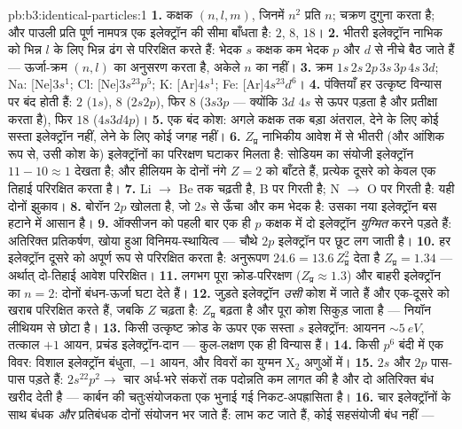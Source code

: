 \begin{solution}{pb:b3:identical-particles:1}
\textbf{1.} कक्षक $(n, l, m)$, जिनमें $n^2$ प्रति $n$; चक्रण दुगुना
करता है; और पाउली प्रति पूर्ण नामपत्र एक इलेक्ट्रॉन की सीमा बाँधता
है: $2$, $8$, $18$।
\textbf{2.} भीतरी इलेक्ट्रॉन नाभिक को भिन्न $l$ के लिए भिन्न ढंग से
परिरक्षित करते हैं: भेदक $s$ कक्षक कम भेदक $p$ और $d$ से नीचे बैठ
जाते हैं --- ऊर्जा-क्रम $(n, l)$ का अनुसरण करता है, अकेले $n$ का
नहीं।
\textbf{3.} क्रम $1s\,2s\,2p\,3s\,3p\,4s\,3d$; Na: [Ne]$3s^1$;
Cl: [Ne]$3s^23p^5$; K: [Ar]$4s^1$; Fe: [Ar]$4s^23d^6$।
\textbf{4.} पंक्तियाँ हर उत्कृष्ट विन्यास पर बंद होती हैं: $2$
($1s$), $8$ ($2s2p$), फिर $8$ ($3s3p$ --- क्योंकि $3d$ $4s$ से ऊपर
पड़ता है और प्रतीक्षा करता है), फिर $18$ ($4s3d4p$)।
\textbf{5.} एक बंद कोश: अगले कक्षक तक बड़ा अंतराल, देने के लिए कोई
सस्ता इलेक्ट्रॉन नहीं, लेने के लिए कोई जगह नहीं।
\textbf{6.} $Z_{\text{प्र}}$ नाभिकीय आवेश में से भीतरी (और आंशिक रूप
से, उसी कोश के) इलेक्ट्रॉनों का परिरक्षण घटाकर मिलता है: सोडियम का
संयोजी इलेक्ट्रॉन $11 - 10 \approx 1$ देखता है; और हीलियम के दोनों
नंगे $Z = 2$ को बाँटते हैं, प्रत्येक दूसरे को केवल एक तिहाई परिरक्षित
करता है।
\textbf{7.} Li $\to$ Be तक चढ़ती है, B पर गिरती है; N $\to$ O पर
गिरती है: यही दोनों झुकाव।
\textbf{8.} बोरॉन $2p$ खोलता है, जो $2s$ से ऊँचा और कम भेदक है: उसका
नया इलेक्ट्रॉन बस हटाने में आसान है।
\textbf{9.} ऑक्सीजन को पहली बार एक ही $p$ कक्षक में दो इलेक्ट्रॉन
\emph{युग्मित} करने पड़ते हैं: अतिरिक्त प्रतिकर्षण, खोया हुआ
विनिमय-स्थायित्व --- चौथे $2p$ इलेक्ट्रॉन पर छूट लग जाती है।
\textbf{10.} हर इलेक्ट्रॉन दूसरे को अपूर्ण रूप से परिरक्षित करता है:
अनुरूपण $24.6 = 13.6\,Z_{\text{प्र}}^2$ देता है $Z_{\text{प्र}} =
1.34$ --- अर्थात् दो-तिहाई आवेश परिरक्षित।
\textbf{11.} लगभग पूरा क्रोड-परिरक्षण ($Z_{\text{प्र}}
\approx 1.3$) और बाहरी इलेक्ट्रॉन का $n = 2$: दोनों बंधन-ऊर्जा घटा
देते हैं।
\textbf{12.} जुड़ते इलेक्ट्रॉन \emph{उसी} कोश में जाते हैं और
एक-दूसरे को खराब परिरक्षित करते हैं, जबकि $Z$ चढ़ता है:
$Z_{\text{प्र}}$ बढ़ता है और पूरा कोश सिकुड़ जाता है --- नियॉन
लीथियम से छोटा है।
\textbf{13.} किसी उत्कृष्ट क्रोड के ऊपर एक सस्ता $s$ इलेक्ट्रॉन:
आयनन $\sim\qty{5}{eV}$, तत्काल $+1$ आयन, प्रचंड इलेक्ट्रॉन-दान
--- कुल-लक्षण एक ही विन्यास हैं।
\textbf{14.} किसी $p^6$ बंदी में एक विवर: विशाल इलेक्ट्रॉन
बंधुता, $-1$ आयन, और विवरों का युग्मन X$_2$ अणुओं में।
\textbf{15.} $2s$ और $2p$ पास-पास पड़ते हैं: $2s^22p^2 \to$ चार
अर्ध-भरे संकरों तक पदोन्नति कम लागत की है और दो अतिरिक्त बंध खरीद
देती है --- कार्बन की चतुःसंयोजकता एक भुनाई गई निकट-अपह्रासिता है।
\textbf{16.} चार इलेक्ट्रॉनों के साथ बंधक \emph{और} प्रतिबंधक दोनों
संयोजन भर जाते हैं: लाभ कट जाते हैं, कोई सहसंयोजी बंध नहीं ---

\end{solution}
